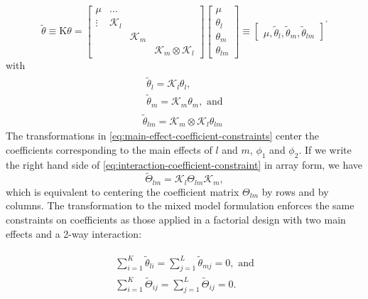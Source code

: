 \documentclass[12pt]{article}
\theoremstyle{definition}
\begin{document}
\begin{equation} \label{eq:mm-parameter-constraints}
\tilde{\theta} \equiv \mathrm{K} \theta = \begin{bmatrix}\mu & \dots &  & \\
\vdots & \mathscr{K}_l  & &  \\
&&\mathscr{K}_m & \\
&&& \mathscr{K}_{m} \otimes \mathscr{K}_l 
\end{bmatrix} 
\begin{bmatrix} \mu \\ \theta_l \\ \theta_m \\ \theta_{lm} 
\end{bmatrix} \equiv \begin{bmatrix} \mu, \tilde{\theta}_l, \tilde{\theta}_m, \tilde{\theta}_{lm}  \end{bmatrix}^\prime
\end{equation}
\noindent
with
\begin{align}
\begin{split} \label{eq:main-effect-coefficient-constraints}
\tilde{\theta}_l = \mathscr{K}_l \theta_l, \\
\tilde{\theta}_m = \mathscr{K}_m \theta_m, \mbox{ and} \end{split} \\
\tilde{\theta}_{lm} = \mathscr{K}_{m} \otimes \mathscr{K}_l \theta_{lm} \label{eq:interaction-coefficient-constraint}
\end{align}
\noindent
The transformations in \ref{eq:main-effect-coefficient-constraints} center the coefficients corresponding to the main effects of $l$ and $m$, $\phi_1$ and $\phi_2$. If we write the right hand side of \ref{eq:interaction-coefficient-constraint} in array form, we have 
\[
\tilde{\Theta}_{lm} = \mathscr{K}_{l} \Theta_{lm}\mathscr{K}_{m},  
\]
which is equivalent to centering the coefficient matrix $\Theta_{lm}$ by rows and by columns. The transformation to the mixed model formulation enforces the same constraints on coefficients as those applied in a factorial design with two main effects and a 2-way interaction:

\begin{align}
\begin{split}
\sum_{i=1}^K \tilde{\theta}_{li} = \sum_{j=1}^L \tilde{\theta}_{mj} = 0, \mbox{ and}\\
\sum_{i=1}^K \tilde{\Theta}_{ij} = \sum_{j=1}^L \tilde{\Theta}_{ij} = 0.
\end{split}
\end{align}
\end{document}
